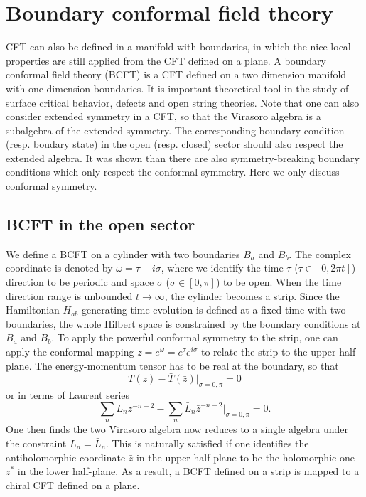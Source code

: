 \documentclass[submission, PhysLectNotes]{SciPost}
\begin{document}
\section{Boundary conformal field theory}
CFT can also be defined in a manifold with boundaries, in which the nice local properties are still applied from the CFT defined on a plane. A boundary conformal field theory (BCFT) is a CFT defined on a two dimension manifold with one dimension boundaries. It is important theoretical tool in the study of surface critical behavior, defects and open string theories. Note that one can also consider extended symmetry in a CFT, so that the Virasoro algebra is a subalgebra of the extended symmetry. The corresponding boundary condition (resp. boudary state) in the open (resp. closed) sector should also respect the extended algebra. It was shown than there are also symmetry-breaking boundary conditions which only respect the conformal symmetry. Here we only discuss conformal symmetry. 

\subsection{BCFT in the open sector}
We define a BCFT on a cylinder with two boundaries $B_a$ and $B_b$. The complex coordinate is denoted by $\omega = \tau + i \sigma$, where we identify the time $\tau$ ($\tau \in [0,2\pi t]$) direction to be periodic and space $\sigma$ ($\sigma \in [0,\pi]$) to be open. When the time direction range is unbounded $t\rightarrow\infty$, the cylinder becomes a strip. Since the Hamiltonian $H_{ab}$ generating time evolution is defined at a fixed time with two boundaries, the whole Hilbert space is constrained by the boundary conditions at $B_a$ and $B_b$. To apply the powerful conformal symmetry to the strip, one can apply the conformal mapping $z = e^\omega = e^\tau e^{i\sigma}$ to relate the strip to the upper half-plane. The energy-momentum tensor has to be real at the boundary, so that
\begin{equation} \label{Eq_T_open}
    T(z) - \bar{T}(\bar{z})\vert_{\sigma=0,\pi} = 0
\end{equation}
or in terms of Laurent series 
\begin{equation}
    \sum_n L_n z^{-n-2} - \sum_n \bar{L}_n \bar{z}^{-n-2}\vert_{\sigma=0,\pi} = 0. 
\end{equation}
One then finds the two Virasoro algebra now reduces to a single algebra under the constraint $L_n = \bar{L}_n$. This is naturally satisfied if one identifies the antiholomorphic coordinate $\bar{z}$ in the upper half-plane to be the holomorphic one $z^*$ in the lower half-plane. As a result, a BCFT defined on a strip is mapped to a chiral CFT defined on a plane. 
\end{document}
